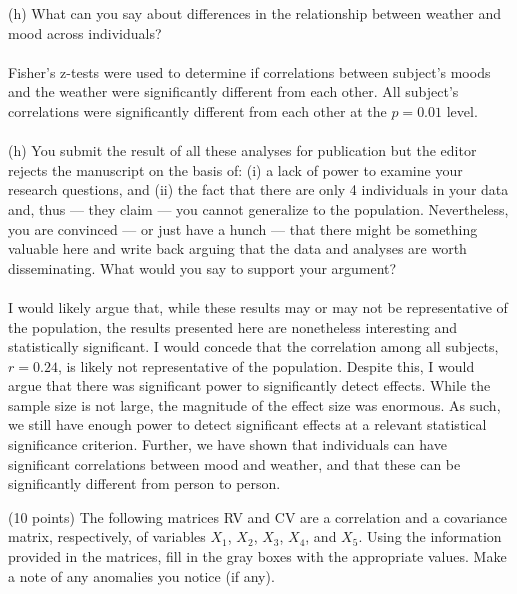 \documentclass[onecolumn,10pt]{jhwhw}
\begin{document}
(h) What can you say about differences in the relationship between weather and mood across individuals?\\
\\
Fisher's z-tests were used to determine if correlations between subject's moods and the weather were significantly different from each other. All subject's correlations were significantly different from each other at the $p=0.01$ level.\\
\\
(h) You submit the result of all these analyses for publication but the editor rejects the manuscript on the basis of: (i) a lack of power to examine your research questions, and (ii) the fact that there are only 4 individuals in your data and, thus --- they claim --- you cannot generalize to the population. Nevertheless, you are convinced --- or just have a hunch --- that there might be something valuable here and write back arguing that the data and analyses are worth disseminating. What would you say to support your argument?\\
\\
I would likely argue that, while these results may or may not be representative of the population, the results presented here are nonetheless interesting and statistically significant. I would concede that the correlation among all subjects, $r=0.24$, is likely not representative of the population. Despite this, I would argue that there was significant power to significantly detect effects. While the sample size is not large, the magnitude of the effect size was enormous. As such, we still have enough power to detect significant effects at a relevant statistical significance criterion. Further, we have shown that individuals can have significant correlations between mood and weather, and that these can be significantly different from person to person.

\clearpage
\problem{}
(10 points) The following matrices RV and CV are a correlation and a covariance matrix, respectively, of variables $X_1$, $X_2$, $X_3$, $X_4$, and $X_5$. Using the information provided in the matrices, fill in the gray boxes with the appropriate values. Make a note of any anomalies you notice (if any).
\end{document}
